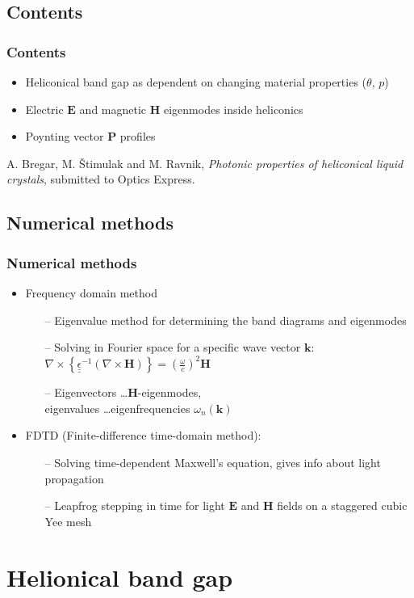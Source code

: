 \documentclass{beamer}
\renewcommand{\vec}{\mathbf}
\newenvironment{slide}[1]{\subsection{#1}\begin{frame}\frametitle{#1}}{\end{frame}}
\begin{document}
\begin{slide}{Contents}
 \begin{itemize}
  \item Heliconical band gap as dependent on changing material properties ($\theta$, $p$)
  \item Electric $\vec{E}$ and magnetic $\vec{H}$ eigenmodes inside heliconics
  \item Poynting vector $\vec{P}$ profiles
 \end{itemize}
 \vspace{1cm}
A. Bregar, M. Štimulak and M. Ravnik, \emph{Photonic properties of heliconical liquid crystals}, submitted to Optics Express. 
 \end{slide}

\begin{slide}{Numerical methods}
\vspace{-1cm}
    \begin{itemize}
      \item Frequency domain method 
      \begin{itemize}
        \item[--] Eigenvalue method for determining the band diagrams and eigenmodes
        \item[--] Solving in Fourier space for a specific wave vector $\vec{k}$: 
$\nabla \times \left\{\underline{\underline{\epsilon}}^{-1} \left(\nabla \times \mathbf{H} \right)
\right\}=\left(\frac{\omega}{c}\right)^2  \mathbf{H}$
        \item[--] Eigenvectors \ldots $\vec{H}$-eigenmodes, \\ eigenvalues \ldots eigenfrequencies $\omega_n(\vec{k})$
     \end{itemize}

      \item FDTD (Finite-difference time-domain method): 
      \begin{itemize}
      \item[--] Solving time-dependent Maxwell's equation, gives info about light propagation
      \item[--] Leapfrog stepping in time for light $\vec{E}$ and $\vec{H}$ fields on a staggered cubic  Yee mesh
      \end{itemize}
    \end{itemize}  
\end{slide}



\section{Helionical band gap}
\end{document}
